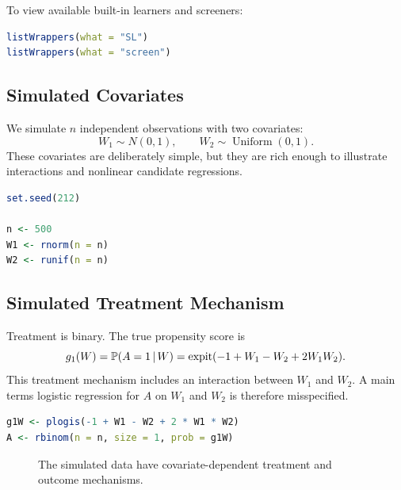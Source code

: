 To view available built-in learners and screeners:

\begin{implementationbox}
\begin{lstlisting}[language=R]
listWrappers(what = "SL")
listWrappers(what = "screen")
\end{lstlisting}
\end{implementationbox}

\subsection{Simulated Covariates}

We simulate $n$ independent observations with two covariates:
\[
W_1\sim N(0,1), \qquad W_2\sim \operatorname{Uniform}(0,1).
\]
These covariates are deliberately simple, but they are rich enough to illustrate
interactions and nonlinear candidate regressions.

\begin{implementationbox}
\begin{lstlisting}[language=R]
set.seed(212)

n <- 500
W1 <- rnorm(n = n)
W2 <- runif(n = n)
\end{lstlisting}
\end{implementationbox}

\subsection{Simulated Treatment Mechanism}

Treatment is binary. The true propensity score is
\[
g_1(W)=\mathbb{P}(A=1\,\vert\, W)
=
\operatorname{expit}(-1+W_1-W_2+2W_1W_2).
\]
This treatment mechanism includes an interaction between $W_1$ and $W_2$. A main
terms logistic regression for $A$ on $W_1$ and $W_2$ is therefore misspecified.

\begin{implementationbox}
\begin{lstlisting}[language=R]
g1W <- plogis(-1 + W1 - W2 + 2 * W1 * W2)
A <- rbinom(n = n, size = 1, prob = g1W)
\end{lstlisting}
\end{implementationbox}

\begin{figure}[H]
\centering
{}
\caption{The simulated data have covariate-dependent treatment and outcome mechanisms.}
\label{fig:ch6-sim-dag}
\end{figure}

